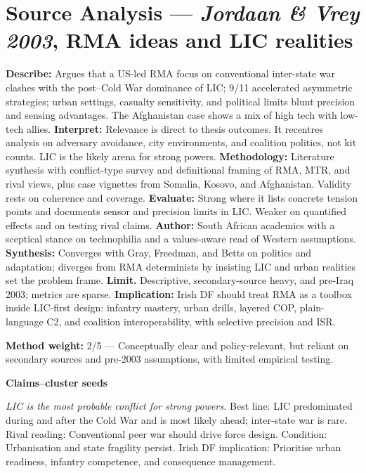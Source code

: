 \parencite{JORD_2003}

\section*{Source Analysis — \textit{Jordaan \& Vrey 2003}, RMA ideas and LIC realities}
\textbf{Describe:} Argues that a US-led RMA focus on conventional inter-state war clashes with the post–Cold War dominance of LIC; 9/11 accelerated asymmetric strategies; urban settings, casualty sensitivity, and political limits blunt precision and sensing advantages. The Afghanistan case shows a mix of high tech with low-tech allies.
\textbf{Interpret:} Relevance is direct to thesis outcomes. It recentres analysis on adversary avoidance, city environments, and coalition politics, not kit counts. LIC is the likely arena for strong powers.
\textbf{Methodology:} Literature synthesis with conflict-type survey and definitional framing of RMA, MTR, and rival views, plus case vignettes from Somalia, Kosovo, and Afghanistan. Validity rests on coherence and coverage.
\textbf{Evaluate:} Strong where it lists concrete tension points and documents sensor and precision limits in LIC. Weaker on quantified effects and on testing rival claims.
\textbf{Author:} South African academics with a sceptical stance on technophilia and a values-aware read of Western assumptions.
\textbf{Synthesis:} Converges with Gray, Freedman, and Betts on politics and adaptation; diverges from RMA determinists by insisting LIC and urban realities set the problem frame.
\textbf{Limit.} Descriptive, secondary-source heavy, and pre-Iraq 2003; metrics are sparse.
\textbf{Implication:} Irish DF should treat RMA as a toolbox inside LIC-first design: infantry mastery, urban drills, layered COP, plain-language C2, and coalition interoperability, with selective precision and ISR.

\textbf{Method weight:} 2/5 — Conceptually clear and policy-relevant, but reliant on secondary sources and pre-2003 assumptions, with limited empirical testing.

\textbf{Claims–cluster seeds}

\textit{LIC is the most probable conflict for strong powers.} Best line: LIC predominated during and after the Cold War and is most likely ahead; inter-state war is rare. Rival reading: Conventional peer war should drive force design. Condition: Urbanisation and state fragility persist. Irish DF implication: Prioritise urban readiness, infantry competence, and consequence management.

